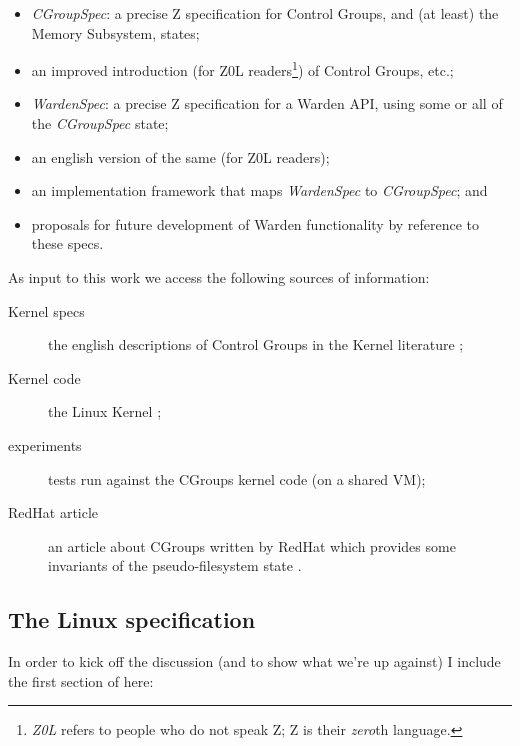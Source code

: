 \documentclass[a4paper,twoside,12pt]{article}
\begin{document}
\begin{itemize}
\item \emph{CGroupSpec}: a precise Z specification for Control Groups, and (at least) the Memory Subsystem, states;
\item an improved introduction (for Z0L readers\footnote{\emph{Z0L} refers to people who do not speak Z; Z is their \emph{zero}th language.}) of Control Groups, etc.;
\item \emph{WardenSpec}: a precise Z specification for a Warden API, using some or all of the \emph{CGroupSpec} state;
\item an english version of the same (for Z0L readers);
\item an implementation framework that maps \emph{WardenSpec} to \emph{CGroupSpec}; and
\item proposals for future development of Warden functionality by reference to these specs.
\end{itemize}
As input to this work we access the following sources of information:
\begin{description}
\item[Kernel specs] the english descriptions of Control Groups in the Kernel literature \cite{linuxgroups};
\item[Kernel code] the Linux Kernel \cite{linuxkernel};
\item[experiments] tests run against the CGroups kernel code (on a shared VM);
\item[RedHat article] an article about CGroups written by RedHat which provides some invariants of the pseudo-filesystem state \cite{rharticle}.
\end{description}

\subsection{The Linux specification \cite{linuxgroups}}

In order to kick off the discussion (and to show what we're up against) I include the first section of \cite{linuxgroups} here:
\end{document}
